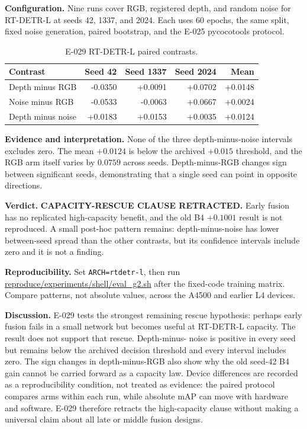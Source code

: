 \documentclass[preprint,12pt]{elsarticle}
\newcommand{\pathcode}[1]{\scriptsize\url{#1}}
\begin{document}
\textbf{Configuration.} Nine runs cover RGB, registered depth, and random
noise for RT-DETR-L at seeds 42, 1337, and 2024. Each uses 60 epochs, the
same split, fixed noise generation, paired bootstrap, and the E-025
pycocotools protocol.

\begin{table}[H]
\centering
\caption{E-029 RT-DETR-L paired contrasts.}
\label{tab:e029}
\begin{tabular}{lrrrr}
\toprule
Contrast & Seed 42 & Seed 1337 & Seed 2024 & Mean\\
\midrule
Depth minus RGB & -0.0350 & +0.0091 & +0.0702 & +0.0148\\
Noise minus RGB & -0.0533 & -0.0063 & +0.0667 & +0.0024\\
Depth minus noise & +0.0183 & +0.0153 & +0.0035 & +0.0124\\
\bottomrule
\end{tabular}
\end{table}

\textbf{Evidence and interpretation.} None of the three depth-minus-noise
intervals excludes zero. The mean \(+0.0124\) is below the archived
\(+0.015\) threshold, and the RGB arm itself varies by \(0.0759\) across
seeds. Depth-minus-RGB changes sign between significant seeds, demonstrating
that a single seed can point in opposite directions.

\textbf{Verdict.} \textbf{CAPACITY-RESCUE CLAUSE RETRACTED.} Early fusion has
no replicated high-capacity benefit, and the old B4 \(+0.1001\) result is not
reproduced. A small post-hoc pattern remains: depth-minus-noise has lower
between-seed spread than the other contrasts, but its confidence intervals
include zero and it is not a finding.

\textbf{Reproducibility.} Set \texttt{ARCH=rtdetr-l}, then run
\pathcode{reproduce/experiments/shell/eval_g2.sh} after
the fixed-code training matrix. Compare patterns, not absolute values, across
the A4500 and earlier L4 devices.

\textbf{Discussion.} E-029 tests the strongest remaining rescue hypothesis:
perhaps early fusion fails in a small network but becomes useful at
RT-DETR-L capacity. The result does not support that rescue. Depth-minus-
noise is positive in every seed but remains below the archived decision threshold
and every interval includes zero. The sign changes in depth-minus-RGB also
show why the old seed-42 B4 gain cannot be carried forward as a capacity law.
Device differences are recorded as a reproducibility condition, not treated
as evidence: the paired protocol compares arms within each run, while
absolute mAP can move with hardware and software. E-029 therefore retracts
the high-capacity clause without making a universal claim about all late or
middle fusion designs.
\end{document}
